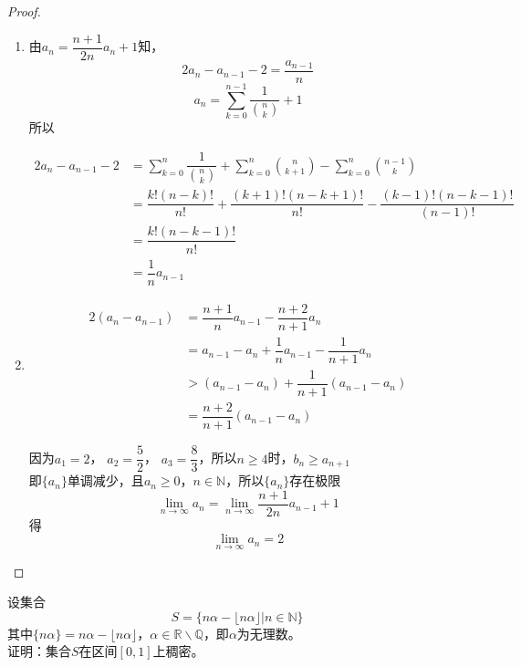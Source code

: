 \begin{proof}

    \begin{enumerate}

        \item 
            由$a_n = \dfrac{n + 1}{2n}a_n + 1$知，
            \[2a_n - a_{n - 1} - 2 = \dfrac{a_{n - 1}}{n}\]
            \[a_n = \sum\limits_{k = 0}^{n - 1}{\dfrac{1}{\binom{n}{k}}} + 1\]
            所以

            \begin{align*}
                2a_n - a_{n - 1} - 2 & = \sum\limits_{k = 0}^{n}{\dfrac{1}{\binom{n}{k}}} + \sum\limits_{k = 0}^{n}{\binom{n}{k + 1}} - \sum\limits_{k = 0}^{n}{\binom{n - 1}{k}} \\
                & = \dfrac{k!(n - k)!}{n!} + \dfrac{(k + 1)!(n - k + 1)!}{n!} - \dfrac{(k - 1)!(n - k - 1)!}{(n - 1)!} \\
                & = \dfrac{k!(n - k - 1)!}{n!} \\
                & = \dfrac{1}{n} a_{n - 1} 
            \end{align*}


        \item 
            \begin{align*}
                2(a_n - a_{n - 1}) & = \dfrac{n + 1}{n}a_{n - 1} - \dfrac{n + 2}{n + 1} a_n \\
                & = a_{n - 1} - a_n + \dfrac{1}{n}a_{n - 1} - \dfrac{1}{n + 1}a_n \\
                & > (a_{n - 1} - a_n) + \dfrac{1}{n + 1}(a_{n - 1} - a_n) \\
                & = \dfrac{n + 2}{n + 1}  (a_{n - 1} - a_n) 
            \end{align*}

            因为$a_1 = 2$， $a_2 = \dfrac{5}{2}$， $a_3 = \dfrac{8}{3}$，所以$n \geq 4$时，$b_n \geq a_{n + 1}$ \\
            即$\{a_n\}$单调减少，且$a_n \geq 0$，$n \in \mathbb{N}$，所以$\{a_n\}$存在极限
            \[\lim\limits_{n \to \infty}{a_n} = \lim\limits_{n \to \infty}{\dfrac{n + 1}{2n}a_{n - 1} + 1}\]
            得
            \[\lim\limits_{n \to \infty}{a_n} = 2\]

    \end{enumerate}

\end{proof}

\begin{lemma}\label{lemma:decimal}

    设集合
    \[S = \{n\alpha - \lfloor n \alpha \rfloor \big| n \in \mathbb{N}\}\]
    其中$\{n\alpha\} = n\alpha - \lfloor n \alpha \rfloor$，$\alpha \in \mathbb{R} \backslash \mathbb{Q}$，即$\alpha$为无理数。\\
    证明：集合$S$在区间$[0, 1]$上稠密。

\end{lemma}

